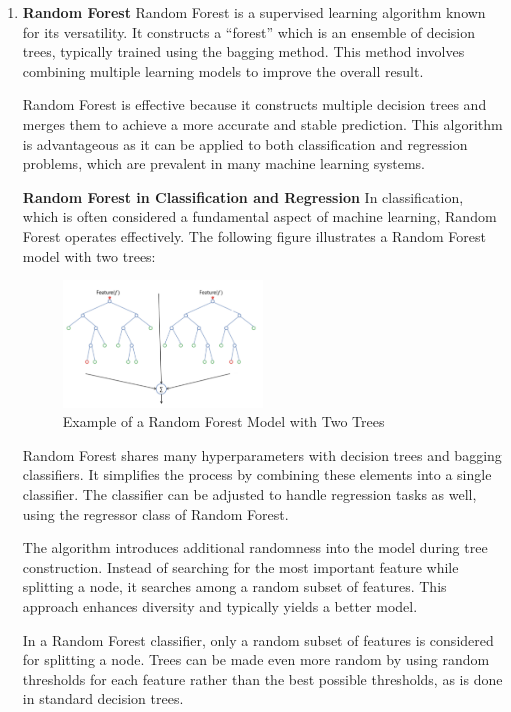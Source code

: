 \begin{enumerate}
\item \textbf{Random Forest}
Random Forest is a supervised learning algorithm known for its versatility. It constructs a “forest” which is an ensemble of decision trees, typically trained using the bagging method. This method involves combining multiple learning models to improve the overall result.

Random Forest is effective because it constructs multiple decision trees and merges them to achieve a more accurate and stable prediction. This algorithm is advantageous as it can be applied to both classification and regression problems, which are prevalent in many machine learning systems.

\textbf{Random Forest in Classification and Regression}
In classification, which is often considered a fundamental aspect of machine learning, Random Forest operates effectively. The following figure illustrates a Random Forest model with two trees:
\begin{figure}[h]
	\centering
	\includegraphics[width=0.5\textwidth]{picture/RF1}
	\caption{Example of a Random Forest Model with Two Trees}
	\label{fig:random_forest}
\end{figure}

Random Forest shares many hyperparameters with decision trees and bagging classifiers. It simplifies the process by combining these elements into a single classifier. The classifier can be adjusted to handle regression tasks as well, using the regressor class of Random Forest.

The algorithm introduces additional randomness into the model during tree construction. Instead of searching for the most important feature while splitting a node, it searches among a random subset of features. This approach enhances diversity and typically yields a better model.

In a Random Forest classifier, only a random subset of features is considered for splitting a node. Trees can be made even more random by using random thresholds for each feature rather than the best possible thresholds, as is done in standard decision trees.


\end{enumerate}
